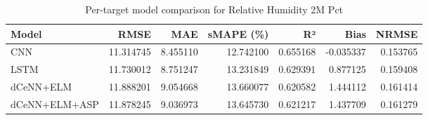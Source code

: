 \begin{table}
\caption{Per-target model comparison for Relative Humidity 2M Pct}
\begin{tabular}{lrrrrrr}
\toprule
Model & RMSE & MAE & sMAPE (\%) & R² & Bias & NRMSE \\
\midrule
CNN & 11.314745 & 8.455110 & 12.742100 & 0.655168 & -0.035337 & 0.153765 \\
LSTM & 11.730012 & 8.751247 & 13.231849 & 0.629391 & 0.877125 & 0.159408 \\
dCeNN+ELM & 11.888201 & 9.054668 & 13.660077 & 0.620582 & 1.444112 & 0.161414 \\
dCeNN+ELM+ASP & 11.878245 & 9.036973 & 13.645730 & 0.621217 & 1.437709 & 0.161279 \\
\bottomrule
\end{tabular}
\end{table}
